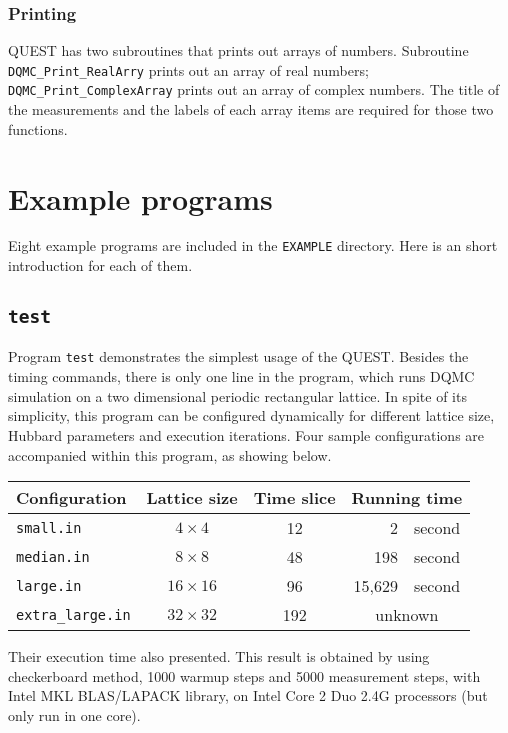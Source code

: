 \documentclass[12pt]{article}
\begin{document}
\subsubsection{Printing}
QUEST has two subroutines that prints out arrays of numbers. Subroutine \verb"DQMC_Print_RealArry" prints out an array of real numbers; \verb"DQMC_Print_ComplexArray" prints out an array of complex numbers. The title of the measurements and the labels of each array items are required for those two functions.

\appendix
\section{Example programs}\label{sec exp}
Eight example programs are included in the \verb|EXAMPLE| directory. Here is an short introduction for each of them.

\subsection{\tt test}
Program \verb|test| demonstrates the simplest usage of the QUEST. Besides the timing commands, there is only one line in the program, which runs DQMC simulation on a two dimensional periodic rectangular lattice. In spite of its simplicity, this program can be configured dynamically for different lattice size, Hubbard parameters and execution iterations.
Four sample configurations are accompanied within this program, as showing below.
	\begin{center}
	\begin{tabular}{|l|c|c|rl|}
	\hline
	Configuration   &  Lattice size & Time slice& \multicolumn{2}{|c|}{Running time}\\
	\hline
	\verb|small.in|  & $4\times 4$ & 12 & 2 & second\\
	\verb|median.in|  & $8\times 8$ & 48 & 198 & second\\
	\verb|large.in|  & $16\times 16$ & 96 & 15,629 & second\\
	\verb|extra_large.in|  & $32\times 32$ & 192 & \multicolumn{2}{|c|}{unknown}\\
	\hline	
	 \end{tabular}
	\end{center}

Their execution time also presented. This result is obtained by using checkerboard method, 1000 warmup steps and 5000 measurement steps, with Intel MKL BLAS/LAPACK library, on Intel Core 2 Duo 2.4G processors (but only run in one core).
	
\end{document}
